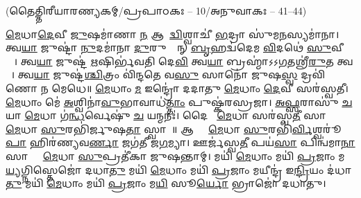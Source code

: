 
\vspace{-1ex}
\centerline{\normalsize (𑌤𑍈𑌤𑍍𑌤𑌿𑌰𑍀𑌯𑌾𑌰𑌣𑍍𑌯𑌕𑌮𑍍/𑌪𑍍𑌰𑌪𑌾𑌠𑌕𑌃 – 10/𑌅𑌨𑍁𑌵𑌾𑌕𑌃 – 41–44)}

\ul{𑌮𑍇}𑌧𑌾\ul{𑌦𑍇}𑌵𑍀 \ul{𑌜𑍁}𑌷𑌮𑌾॑𑌣𑌾 \ul{𑌨} 𑌆𑌗𑌾᳚\ul{𑌦𑍍𑌵𑌿}𑌶𑍍𑌵𑌾𑌚𑍀॑ \ul{𑌭}𑌦𑍍𑌰𑌾 𑌸𑍁॑𑌮\ul{𑌨}𑌸𑍍𑌯𑌮𑌾॑𑌨𑌾। 𑌤𑍍𑌵\ul{𑌯𑌾} 𑌜𑍁𑌷𑍍𑌟𑌾॑ \ul{𑌨𑍁}𑌦𑌮𑌾॑𑌨𑌾 \ul{𑌦𑍁}𑌰𑍁𑌕𑍍𑌤𑌾᳚𑌨𑍍 \ul{𑌬𑍃}𑌹𑌦𑍍𑌵॑𑌦𑍇𑌮 \ul{𑌵𑌿}𑌦𑌥𑍇॑ \ul{𑌸𑍁}𑌵𑍀𑌰𑌾𑌃᳚। 𑌤𑍍𑌵\ul{𑌯𑌾} 𑌜𑍁𑌷𑍍𑌟॑ \ul{𑌋}𑌷𑌿𑌰𑍍𑌭॑𑌵𑌤𑌿 𑌦𑍇\ul{𑌵𑌿} 𑌤𑍍𑌵\ul{𑌯𑌾} 𑌬𑍍𑌰𑌹𑍍𑌮𑌾॑𑌽𑌽\ul{𑌗}𑌤𑌶𑍍𑌰𑍀॑\ul{𑌰𑍁}𑌤 𑌤𑍍𑌵𑌯𑌾᳚। 𑌤𑍍𑌵\ul{𑌯𑌾} 𑌜𑍁𑌷𑍍𑌟॑\ul{𑌶𑍍𑌚𑌿}𑌤𑍍𑌰𑌂 𑌵𑌿॑𑌨𑍍𑌦𑌤𑍇 𑌵\ul{𑌸𑍁} 𑌸𑌾𑌨𑍋॑ 𑌜𑍁𑌷\ul{𑌸𑍍𑌵} 𑌦𑍍𑌰𑌵𑌿॑𑌣𑍋 𑌨 𑌮𑍇𑌧𑍇॥ 
\ul{𑌮𑍇}𑌧𑌾𑌂 \ul{𑌮} 𑌇𑌨𑍍𑌦𑍍𑌰𑍋॑ 𑌦𑌦𑌾𑌤𑍁 \ul{𑌮𑍇}𑌧𑌾𑌂 \ul{𑌦𑍇}𑌵𑍀 𑌸𑌰॑𑌸𑍍𑌵𑌤𑍀। \ul{𑌮𑍇}𑌧𑌾𑌂 𑌮𑍇॑ \ul{𑌅}𑌶𑍍𑌵𑌿𑌨𑌾॑\ul{𑌵𑍁}𑌭𑌾𑌵𑌾𑌧॑\ul{𑌤𑍍𑌤𑌾𑌂} 𑌪𑍁𑌷𑍍𑌕॑𑌰𑌸𑍍𑌰𑌜𑌾। \ul{𑌅}\ul{𑌫𑍍𑌸}𑌰𑌾𑌸𑍁॑ \ul{𑌚} 𑌯𑌾 \ul{𑌮𑍇}𑌧𑌾 𑌗॑\ul{𑌨𑍍𑌧}𑌰𑍍𑌵𑍇𑌷𑍁॑ \ul{𑌚} 𑌯𑌨𑍍𑌮𑌨𑌃॑। 𑌦𑍈𑌵𑍀𑌂᳚ \ul{𑌮𑍇}𑌧𑌾 𑌸𑌰॑𑌸𑍍𑌵\ul{𑌤𑍀} 𑌸𑌾 𑌮𑌾𑌂᳚ \ul{𑌮𑍇}𑌧𑌾 \ul{𑌸𑍁}𑌰𑌭𑌿॑𑌰𑍍𑌜𑍁𑌷\ul{𑌤𑌾}\ul{} 𑌸𑍍𑌵𑌾𑌹𑌾᳚॥ 
𑌆 𑌮𑌾𑌂᳚ \ul{𑌮𑍇}𑌧𑌾 \ul{𑌸𑍁}𑌰𑌭𑌿॑\ul{𑌰𑍍𑌵𑌿}𑌶𑍍𑌵𑌰𑍂॑\ul{𑌪𑌾} 𑌹𑌿𑌰॑𑌣𑍍𑌯𑌵\ul{𑌰𑍍𑌣𑌾} 𑌜𑌗॑𑌤𑍀 𑌜\ul{𑌗}𑌮𑍍𑌯𑌾। 𑌊𑌰𑍍𑌜॑𑌸𑍍𑌵\ul{𑌤𑍀} 𑌪𑌯॑\ul{𑌸𑌾} 𑌪𑌿𑌨𑍍𑌵॑𑌮𑌾\ul{𑌨𑌾} 𑌸𑌾 𑌮𑌾𑌂᳚ \ul{𑌮𑍇}𑌧𑌾 \ul{𑌸𑍁}𑌪𑍍𑌰𑌤𑍀॑𑌕𑌾 𑌜𑍁𑌷𑌨𑍍𑌤𑌾𑌮𑍍। 𑌮𑌯𑌿॑ \ul{𑌮𑍇}𑌧𑌾𑌂 𑌮𑌯𑌿॑ \ul{𑌪𑍍𑌰}𑌜𑌾𑌂 𑌮\ul{𑌯𑍍𑌯}𑌗𑍍𑌨𑌿𑌸𑍍𑌤𑍇𑌜𑍋॑ 𑌦𑌧𑌾\ul{𑌤𑍁} 𑌮𑌯𑌿॑ \ul{𑌮𑍇}𑌧𑌾𑌂 𑌮𑌯𑌿॑ \ul{𑌪𑍍𑌰}𑌜𑌾𑌂 𑌮𑌯𑍀𑌨𑍍𑌦𑍍𑌰॑ 𑌇\ul{𑌨𑍍𑌦𑍍𑌰𑌿}𑌯𑌂 𑌦॑𑌧𑌾\ul{𑌤𑍁} 𑌮𑌯𑌿॑ \ul{𑌮𑍇}𑌧𑌾𑌂 𑌮𑌯𑌿॑ \ul{𑌪𑍍𑌰}𑌜𑌾𑌂 𑌮\ul{𑌯𑌿} 𑌸𑍂\ul{𑌰𑍍𑌯𑍋} 𑌭𑍍𑌰𑌾𑌜𑍋॑ 𑌦𑌧𑌾𑌤𑍁। 



